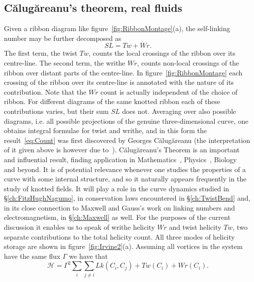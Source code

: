 \subsection{C\u{a}lug\u{a}reanu's theorem, real fluids}
Given a ribbon diagram like figure~\ref{fig:RibbonMontage}(a), the self-linking number may be further decomposed as
\begin{equation}
    SL = Tw + Wr.
    \label{eq:Count}
\end{equation}
The first term, the twist $Tw$, counts the local crossings of the ribbon over its centre-line. The second term, the writhe $Wr$, counts non-local crossings of the ribbon over distant parts of the centre-line. In figure~\ref{fig:RibbonMontage} each crossing of the ribbon over its centre-line is annotated with the nature of its contribution. Note that the $Wr$ count is actually independent of the choice of ribbon. For different diagrams of the same knotted ribbon each of these contributions varies, but their sum $SL$ does not. Averaging over also possible diagrams, i.e. all possible projections of the genuine three-dimensional curve, one obtains integral formulae for twist and writhe, and in this form the result~\eqref{eq:Count} was first discovered by Georges C\u{a}lug\u{a}reanu \citep{Calugareanu1959,Calugareanu1961} (the interpretation of it given above is however due to~\citep{Dennis2005}). C\u{a}lug\u{a}reanu's Theorem is an important and influential result, finding application in Mathematics~\citep{White1969,Adams2004,Aldinger1995}, Physics~\citep{Moffat1992, Goldstein1995, Berger2006}, Biology~\citep{Fuller1978, Winfree1983, Sumners1995} and beyond. It is of potential relevance whenever one studies the properties of a curve with some internal structure, and so it naturally appears frequently in the study of knotted fields. It will play a role in the curve dynamics studied in \S\ref{ch:FitzHughNagumo}, in conservation laws encountered in \S\ref{ch:TwistBend} and, in its close connection to Maxwell and Gauss's work on linking numbers and electromagnetism, in \S\ref{ch:Maxwell} as well. For the purposes of the current discussion it enables us to speak of writhe helicity $Wr$ and twist helicity $Tw$, two separate contributions to the total helicity count. All three modes of helicity storage are shown in figure~\ref{fig:Irvine2}(a). Assuming all vortices in the system have the same flux $\Gamma$ we have that
\begin{equation}
 \mathcal{H} = \Gamma^2\sum_i \sum_{j \neq i} Lk(C_i,C_j) + Tw(C_i) + Wr(C_i).\label{eq:twistpluswrithe} 
\end{equation}

